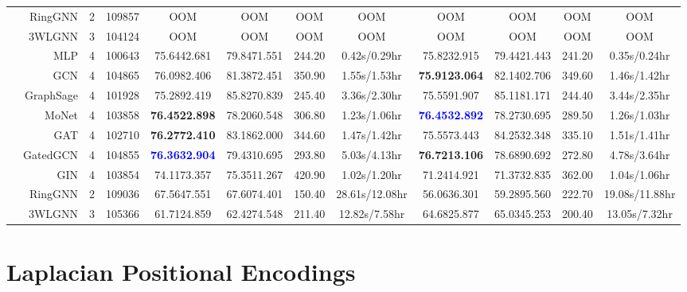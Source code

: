 \documentclass{article}
\newcommand{\best}[1]{{\color{red}\textbf{#1}}}
\begin{document}
\begin{table}[t]
{\begin{tabular}{crcc|cccc|cccc}
        & RingGNN & 2 & 109857 & OOM & OOM & OOM & OOM & OOM & OOM & OOM & OOM\\
        & 3WLGNN & 3 & 104124 & OOM & OOM & OOM & OOM & OOM & OOM & OOM & OOM\\
        \midrule
        \parbox[t]{2mm}{} & MLP & 4 & 100643 & 75.6442.681 & 79.8471.551 & 244.20 & 0.42s/0.29hr & 75.8232.915 & 79.4421.443 & 241.20 & 0.35s/0.24hr\\
        & GCN & 4 & 104865 & 76.0982.406 & 81.3872.451 & 350.90 & 1.55s/1.53hr & \textbf{75.9123.064} & 82.1402.706 & 349.60 & 1.46s/1.42hr \\
        & GraphSage & 4 & 101928 & 75.2892.419 & 85.8270.839 & 245.40 & 3.36s/2.30hr & 75.5591.907 & 85.1181.171 & 244.40 & 3.44s/2.35hr \\
        & MoNet & 4 & 103858 & \best{76.4522.898} & 78.2060.548 & 306.80 & 1.23s/1.06hr & \textcolor{blue}{\textbf{76.4532.892}} & 78.2730.695 & 289.50 & 1.26s/1.03hr\\
        & GAT & 4 & 102710 & \textbf{76.2772.410} & 83.1862.000 & 344.60 & 1.47s/1.42hr & 75.5573.443 & 84.2532.348 & 335.10 & 1.51s/1.41hr\\
        & GatedGCN & 4 & 104855 & \textcolor{blue}{\textbf{76.3632.904}} & 79.4310.695 & 293.80 & 5.03s/4.13hr & \best{76.7213.106} & 78.6890.692 & 272.80 & 4.78s/3.64hr \\
& GIN & 4 & 103854 & 74.1173.357 & 75.3511.267 & 420.90 & 1.02s/1.20hr & 71.2414.921 & 71.3732.835 & 362.00 & 1.04s/1.06hr\\
& RingGNN & 2 & 109036 & 67.5647.551 & 67.6074.401 & 150.40 & 28.61s/12.08hr & 56.0636.301 & 59.2895.560 & 222.70 & 19.08s/11.88hr \\
& 3WLGNN & 3 & 105366 & 61.7124.859 & 62.4274.548 & 211.40 & 12.82s/7.58hr & 64.6825.877 & 65.0345.253 & 200.40 & 13.05s/7.32hr \\
        \bottomrule
    \end{tabular}
    \label{tab:tableTU}
}
\end{table}












\section{Laplacian Positional Encodings}
\label{sec_PE}
\end{document}
